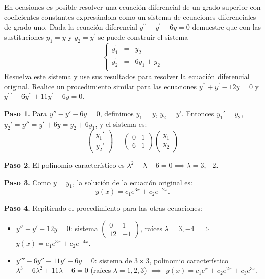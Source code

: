 \begin{prob}
En ocasiones es posible resolver una ecuación diferencial de un grado superior con coeficientes constantes expresándola como un sistema de ecuaciones diferenciales de grado uno. Dada la ecuación diferencial $y^{\prime \prime}-y^{\prime}-6y=0$ demuestre que con las sustituciones $y_{1}=y$ y $y_{2}=y^{\prime}$ se puede construir el sistema
\[
\left\lbrace \begin{matrix}
y_{1}^{\prime}&=& y_2\\
y_{2}^{\prime}&=&6y_1+y_2\\
\end{matrix} \right.
\]
Resuelva este sistema y use sus resultados para resolver la ecuación diferencial original. Realice un procedimiento similar para las ecuaciones $y^{\prime \prime}+y^{\prime}-12y=0$ y $y^{\prime \prime \prime}-6y^{\prime\prime}+11y^{\prime}-6y=0.$
\begin{myproof}
\textbf{Paso 1.} Para $y''-y'-6y=0$, definimos $y_1=y$, $y_2=y'$. Entonces $y_1'=y_2$, $y_2'=y''=y'+6y=y_2+6y_1$, y el sistema es:
\[
\begin{pmatrix} y_1' \\ y_2' \end{pmatrix} = \begin{pmatrix} 0 & 1 \\ 6 & 1 \end{pmatrix} \begin{pmatrix} y_1 \\ y_2 \end{pmatrix}
\]

\textbf{Paso 2.} El polinomio característico es $\lambda^2 - \lambda - 6 = 0 \implies \lambda=3,-2$.

\textbf{Paso 3.} Como $y=y_1$, la solución de la ecuación original es:
\[
\boxed{y(x) = c_1 e^{3x} + c_2 e^{-2x}.}
\]

\textbf{Paso 4.} Repitiendo el procedimiento para las otras ecuaciones:
\begin{itemize}
  \item $y'' + y' - 12y = 0$: sistema $\begin{pmatrix} 0 & 1 \\ 12 & -1 \end{pmatrix}$, raíces $\lambda=3,-4$ $\implies$ $y(x)=c_1e^{3x}+c_2e^{-4x}$.
  \item $y''' - 6y'' + 11y' - 6y = 0$: sistema de $3\times 3$, polinomio característico $\lambda^3 - 6\lambda^2 + 11\lambda - 6 = 0$ (raíces $\lambda=1,2,3$) $\implies$ $y(x)=c_1e^{x}+c_2e^{2x}+c_3e^{3x}$.
\end{itemize}
\end{myproof}
\end{prob}


